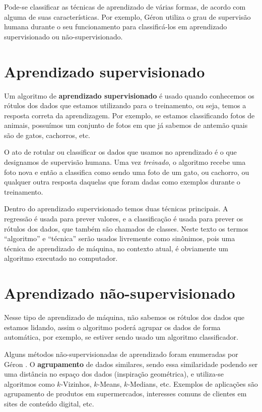 \documentclass[12pt,brazil]{article}
\newcommand{\defi}[1]{\textbf{#1}}
\begin{document}
Pode-se classificar as técnicas de aprendizado de várias formas, de acordo com alguma de suas características. Por exemplo, Géron \citep{hands} utiliza o grau de supervisão humana durante o seu funcionamento para classificá-los em aprendizado supervisionado ou não-supervisionado.

\section*{Aprendizado supervisionado}

 Um algoritmo de \defi{aprendizado supervisionado} é usado quando conhecemos os rótulos dos dados que estamos utilizando para o treinamento, ou seja, temos a resposta correta da aprendizagem. Por exemplo, se estamos classificando fotos de animais, possuímos um conjunto de fotos em que já sabemos de antemão quais são de gatos, cachorros, etc.

 O ato de rotular ou classificar os dados que usamos no aprendizado é o que designamos de supervisão humana. Uma vez \emph{treinado}, o algoritmo recebe uma foto nova e então a classifica como sendo uma foto de um gato, ou cachorro, ou qualquer outra resposta daquelas que foram dadas como exemplos durante o treinamento.

Dentro do aprendizado supervisionado temos duas técnicas principais. A regressão é usada para prever valores, e a classificação é usada para prever os rótulos dos dados, que também são chamados de classes. Neste texto os termos ``algoritmo'' e ``técnica'' serão usados livremente como sinônimos, pois uma técnica de aprendizado de máquina, no contexto atual, é obviamente um algoritmo executado no computador.

\section*{Aprendizado não-supervisionado}

Nesse tipo de aprendizado de máquina, não sabemos os rótulos dos dados que estamos lidando, assim o algoritmo poderá agrupar os dados de forma automática, por exemplo, se estiver sendo usado um algoritmo classificador.

Alguns métodos não-supervisionadas de aprendizado foram enumeradas por Géron \citep{hands}. O \textbf{agrupamento} de dados similares, sendo essa similaridade podendo ser uma distância no espaço dos dados (inspiração geométrica), e utiliza-se algoritmos como $k$-Vizinhos, $k$-Means, $k$-Medians, etc. Exemplos de aplicações são agrupamento de produtos em supermercados, interesses comuns de clientes em sites de conteúdo digital, etc.
\end{document}
